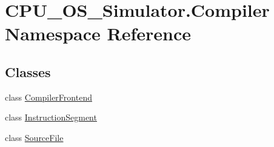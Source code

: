 \hypertarget{namespace_c_p_u___o_s___simulator_1_1_compiler}{}\section{C\+P\+U\+\_\+\+O\+S\+\_\+\+Simulator.\+Compiler Namespace Reference}
\label{namespace_c_p_u___o_s___simulator_1_1_compiler}
\subsection*{Classes}
\begin{DoxyCompactItemize}
\item 
class \hyperlink{class_c_p_u___o_s___simulator_1_1_compiler_1_1_compiler_frontend}{Compiler\+Frontend}
\item 
class \hyperlink{class_c_p_u___o_s___simulator_1_1_compiler_1_1_instruction_segment}{Instruction\+Segment}
\item 
class \hyperlink{class_c_p_u___o_s___simulator_1_1_compiler_1_1_source_file}{Source\+File}
\end{DoxyCompactItemize}
